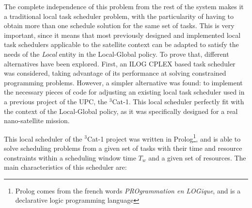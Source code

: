 
The complete independence of this problem from the rest of the system makes it a traditional local task scheduler problem, with the particularity of having to obtain more than one schedule solution for the same set of tasks. This is very important, since it means that most previously designed and implemented local task schedulers applicable to the satellite context can be adapted to satisfy the needs of the \emph{Local} entity in the Local-Global policy. To prove that, different alternatives have been explored. First, an ILOG CPLEX based task scheduler was considered, taking advantage of its performance at solving constrained programming problems. However, a simpler alternative was found: to implement the necessary pieces of code for adjusting an existing local task scheduler used in a previous project of the UPC, the $^3$Cat-1. This local scheduler perfectly fit with the context of the Local-Global policy, as it was specifically designed for a real nano-satellite mission.

This local scheduler of the $^3$Cat-1 project was written in Prolog\footnote{Prolog comes from the french words \textit{PROgrammation en LOGique}, and is a declarative logic programming language}, and is able to solve scheduling problems from a given set of tasks with their time and resource constraints within a scheduling window time $T_w$ and a given set of resources. The main characteristics of this scheduler are:

